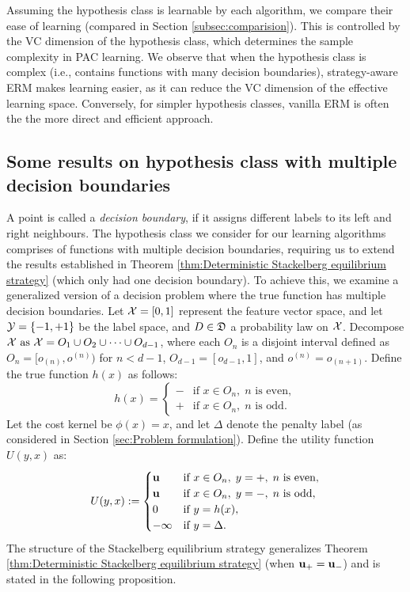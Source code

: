 Assuming the hypothesis class is learnable by each algorithm, we compare their ease of learning (compared in Section \ref{subsec:comparision}). This is controlled by the VC dimension of the hypothesis class, which determines the sample complexity in PAC learning. We observe that when the hypothesis class is complex (i.e., contains functions with many decision boundaries), strategy-aware ERM makes learning easier, as it can reduce the VC dimension of the effective learning space. Conversely, for simpler hypothesis classes, vanilla ERM is often the the more direct and efficient approach.


\subsection{Some results on hypothesis class with multiple decision boundaries}

A point is called a \textit{decision boundary}, if it assigns different labels to its left and right neighbours. 
The hypothesis class we consider for our learning algorithms comprises of functions with multiple decision boundaries, requiring us to extend the results established in Theorem \ref{thm:Deterministic Stackelberg equilibrium strategy} (which only had one decision boundary). To achieve this, we examine a generalized version of a decision problem where the true function has multiple decision boundaries. Let $\mathcal{X} = [0,1]$ represent the feature vector space, and let $\mathcal{Y} = \{-1, +1\}$ be the label space, and $D \in \mathfrak{D}$ a probability law on $\mathcal{X}$. Decompose $\mathcal{X} \text{ as } \mathcal{X} = O_1 \cup O_2 \cup \cdots \cup O_{d-1}$, where each $O_n$ is a disjoint interval defined as $O_n = [o_{(n)}, o^{(n)})$ for $n < d-1$, $O_{d-1} = [o_{d-1}, 1]$, and $o^{(n)} = o_{(n+1)}$. Define the true function $h(x)$ as follows:
\begin{equation}\label{eqn:multiple boundary true function}
    h(x) = \begin{cases}
        \minus & \text{if } x \in O_n, \; n \text{ is even}, \\
        \plus & \text{if } x \in O_n, \; n \text{ is odd}.
    \end{cases}
\end{equation}
Let the cost kernel be $\phi(x) = x$, and let $\Delta$ denote the penalty label (as considered in Section \ref{sec:Problem formulation}). Define the utility function $U(y,x)$ as:
\begin{equation}\label{eqn:Utility2}
    U(y,x) := \begin{cases}
        \mathbf{u} & \text{if } x \in O_n, \; y = \mathbf{+}, \; n \text{ is even}, \\
        \mathbf{u} & \text{if } x \in O_n, \; y = \mathbf{-}, \; n \text{ is odd}, \\
        0 & \text{if } y = h(x), \\
        -\infty & \text{if } y = \Delta.
    \end{cases}
\end{equation}
The structure of the Stackelberg equilibrium strategy generalizes Theorem \ref{thm:Deterministic Stackelberg equilibrium strategy} (when $\mathbf{u_+} = \mathbf{u_-}$) and is stated in the following proposition.

